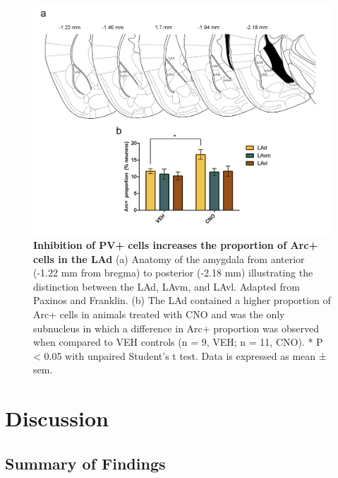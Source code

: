 \documentclass[12pt,a4paperpaper,]{report}
\begin{document}
\begin{figure}[htbp]
\centering
\includegraphics{source/figures/figure_5.jpg}
\caption{\textbf{Inhibition of PV+ cells increases the proportion of
Arc+ cells in the LAd} (a) Anatomy of the amygdala from anterior (-1.22
mm from bregma) to posterior (-2.18 mm) illustrating the distinction
between the LAd, LAvm, and LAvl. Adapted from Paxinos and Franklin. (b)
The LAd contained a higher proportion of Arc+ cells in animals treated
with CNO and was the only subnucleus in which a difference in Arc+
proportion was observed when compared to VEH controls (n = 9, VEH; n =
11, CNO). * P \textless{} 0.05 with unpaired Student's t test. Data is
expressed as mean ± sem. \label{ref_a_figure}}
\end{figure}

\chapter{Discussion}\label{discussion}

\section{Summary of Findings}\label{summary-of-findings}
\end{document}
